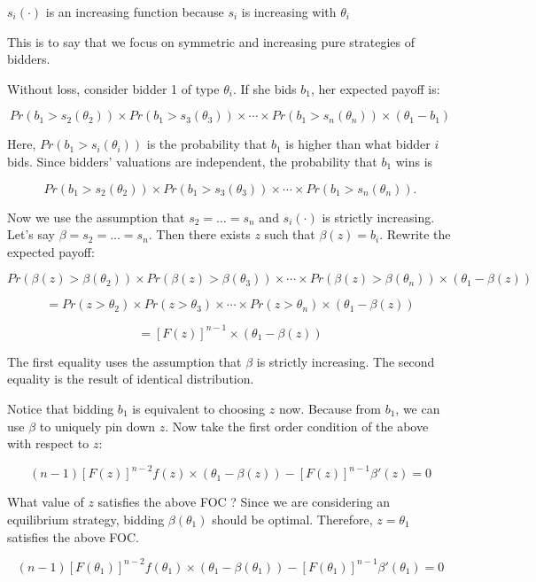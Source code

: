 \documentclass[12pt, oneside]{article}
\begin{document}
$s_i(\cdot)$ is an increasing function because $s_i$ is increasing with $\theta_i$

This is to say that we focus on symmetric and increasing pure strategies of bidders.

Without loss, consider bidder 1 of type \( \theta_i \). If she bids \( b_1 \), her expected payoff is:

\[
Pr(b_1 > s_2(\theta_2)) \times Pr(b_1 > s_3(\theta_3)) \times \cdots \times Pr(b_1 > s_n(\theta_n)) \times (\theta_1 - b_1)
\]

Here, \( Pr(b_1 > s_i(\theta_i)) \) is the probability that \( b_1 \) is higher than what bidder \( i \) bids. Since bidders’ valuations are independent, the probability that \( b_1 \) wins is 

\[
Pr(b_1 > s_2(\theta_2)) \times Pr(b_1 > s_3(\theta_3)) \times \cdots \times Pr(b_1 > s_n(\theta_n)).
\]

Now we use the assumption that \( s_2 = \dots = s_n \) and \( s_i(\cdot) \) is strictly increasing. Let’s say \( \beta = s_2 = \dots = s_n \). Then there exists \( z \) such that \( \beta(z) = b_i \). Rewrite the expected payoff:

\[
Pr(\beta(z) > \beta(\theta_2)) \times Pr(\beta(z) > \beta(\theta_3)) \times \cdots \times Pr(\beta(z) > \beta(\theta_n)) \times (\theta_1 - \beta(z))
\]

\[
= Pr(z > \theta_2) \times Pr(z > \theta_3) \times \cdots \times Pr(z > \theta_n) \times (\theta_1 - \beta(z))
\]

\[
= [F(z)]^{n-1} \times (\theta_1 - \beta(z))
\]

The first equality uses the assumption that \( \beta \) is strictly increasing. The second equality is the result of identical distribution.

Notice that bidding \( b_1 \) is equivalent to choosing \( z \) now. Because from \( b_1 \), we can use \( \beta \) to uniquely pin down \( z \). Now take the first order condition of the above with respect to \( z \):

\[
(n - 1)[F(z)]^{n-2} f(z) \times (\theta_1 - \beta(z)) - [F(z)]^{n-1} \beta'(z) = 0
\]

What value of \( z \) satisfies the above FOC ? Since we are considering an equilibrium strategy, bidding \( \beta(\theta_1) \) should be optimal. Therefore, \( z = \theta_1 \) satisfies the above FOC.

\[
(n - 1)[F(\theta_1)]^{n-2} f(\theta_1) \times (\theta_1 - \beta(\theta_1)) - [F(\theta_1)]^{n-1} \beta'(\theta_1) = 0
\]
\end{document}
